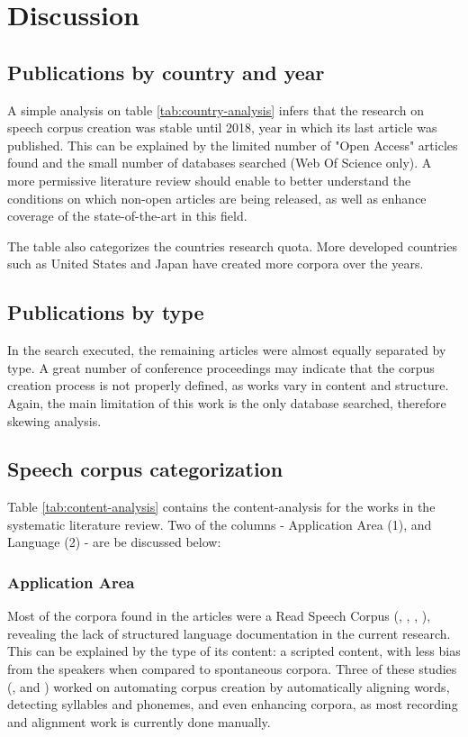\section{Discussion}
\label{sec:discussion}

\subsection{Publications by country and year}

A simple analysis on table \ref{tab:country-analysis} infers that the research on speech corpus creation was stable until 2018, year in which its last article was published. This can be explained by the limited number of "Open Access" articles found and the small number of databases searched (Web Of Science only). A more permissive literature review should enable to better understand the conditions on which non-open articles are being released, as well as enhance coverage of the state-of-the-art in this field.

The table also categorizes the countries research quota. More developed countries such as United States and Japan have created more corpora over the years.

\subsection{Publications by type}

In the search executed, the remaining articles were almost equally separated by type. A great number of conference proceedings may indicate that the corpus creation process is not properly defined, as works vary in content and structure. Again, the main limitation of this work is the only database searched, therefore skewing analysis.

\subsection{Speech corpus categorization}

Table \ref{tab:content-analysis} contains the content-analysis for the works in the systematic literature review. Two of the columns - Application Area (1), and Language (2) - are be discussed below:

\subsubsection{Application Area}

Most of the corpora found in the articles were a Read Speech Corpus (\cite{almeman2018building}, \cite{ruilan2016improving}, \cite{klessa2013paralingua}, \cite{clopper2006nationwide}), revealing the lack of structured language documentation in the current research. This can be explained by the type of its content: a scripted content, with less bias from the speakers when compared to spontaneous corpora. Three of these studies (\cite{ng2017shefce}, \cite{mansikkaniemi2017automatic} and \cite{nagino2008building}) worked on automating corpus creation by automatically aligning words, detecting syllables and phonemes, and even enhancing corpora, as most recording and alignment work is currently done manually.

